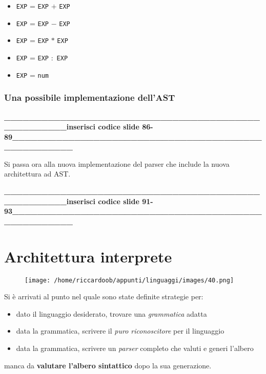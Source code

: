 \begin{itemize}[label={}]
    \item \texttt{EXP} = \texttt{EXP} $+$ \texttt{EXP}
    \item \texttt{EXP} = \texttt{EXP} $-$ \texttt{EXP}
    \item \texttt{EXP} = \texttt{EXP} $*$ \texttt{EXP}
    \item \texttt{EXP} = \texttt{EXP} $:$ \texttt{EXP}
    \item \texttt{EXP} = \texttt{num}
\end{itemize}
\setlist{}

\subsubsection{Una possibile implementazione dell'AST}
\textbf{\_\_\_\_\_\_\_\_\_\_\_\_\_\_\_\_\_\_\_\_\_\_\_\_\_\_\_\_\_\_\_\_\_\_\_\_\_\_\_\_\_\_\_\_\_\_\_\_\_\_\_inserisci codice slide 86-89\_\_\_\_\_\_\_\_\_\_\_\_\_\_\_\_\_\_\_\_\_\_\_\_\_\_\_\_\_\_\_\_\_\_\_\_\_\_\_\_\_\_\_\_\_\_\_\_\_\_\_}

Si passa ora alla nuova implementazione del parser che include la nuova architettura ad AST.

\textbf{\_\_\_\_\_\_\_\_\_\_\_\_\_\_\_\_\_\_\_\_\_\_\_\_\_\_\_\_\_\_\_\_\_\_\_\_\_\_\_\_\_\_\_\_\_\_\_\_\_\_\_inserisci codice slide 91-93\_\_\_\_\_\_\_\_\_\_\_\_\_\_\_\_\_\_\_\_\_\_\_\_\_\_\_\_\_\_\_\_\_\_\_\_\_\_\_\_\_\_\_\_\_\_\_\_\_\_\_}

\section{Architettura interprete}
\begin{figure}[H]
    \centering
    \texttt{[image: /home/riccardoob/appunti/linguaggi/images/40.png]}
\end{figure}
Si è arrivati al punto nel quale sono state definite strategie per:
\begin{itemize}
    \item dato il linguaggio desiderato, trovare una \textit{grammatica} adatta
    \item data la grammatica, scrivere il \textit{puro riconoscitore} per il linguaggio
    \item data la grammatica, scrivere un \textit{parser} completo che valuti e generi l'albero
\end{itemize}

manca da \textbf{valutare l'albero sintattico} dopo la sua generazione.

